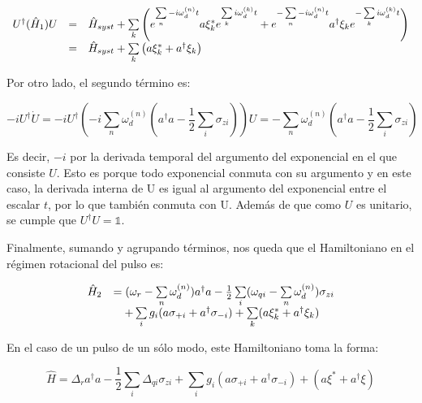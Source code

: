 \begin{equation}
    \begin{array}{r c l}
        U^\dagger (\hat{H}_1) U &=& \hat{H}_{syst} + \sum\limits_k \left(e^{\sum\limits_n-i \omega_d^{(n)} t} a\xi_k^*e^{\sum\limits_k i\omega_d^{(k)}t}+ e^{-\sum\limits_n-i \omega_d^{(n)} t} a^\dagger\xi_ke^{-\sum\limits_k i\omega_d^{(k)}t}\right) \\
                                &=& \hat{H}_{syst} + \sum\limits_k \left(a\xi_k^* + a^\dagger\xi_k\right)
    \end{array}
\end{equation}

Por otro lado, el segundo término es:

\begin{equation}
    - i U^\dagger \dot{U} = -i U^\dagger (-i \sum\limits_n \omega_d^{(n)} (a^\dagger a - \frac{1}{2} \sum\limits_i \sigma_{z i})) U = - \sum\limits_n \omega_d^{(n)}(a^\dagger a - \frac{1}{2} \sum\limits_i \sigma_{z i})
\end{equation}

Es decir, $-i$ por la derivada temporal del argumento del exponencial en el que consiste $U$. Esto es porque todo exponencial conmuta con su argumento y en este caso, la derivada interna de U es igual al argumento del exponencial entre el escalar $t$, por lo que también conmuta con U. Además de que como $U$ es unitario, se cumple que $U^\dagger U = \mathds{1}$.

Finalmente, sumando y agrupando términos, nos queda que el Hamiltoniano en el régimen rotacional del pulso es:

\begin{equation}
    \begin{array}{r l}
        \hat{H}_2 &= (\omega_r - \sum\limits_n \omega_d^{(n)}) a^\dag a - \frac{1}{2} \sum\limits_i (\omega_{qi} - \sum\limits_n \omega_d^{(n)}) \sigma_{zi} \\
                  &\quad + \sum\limits_i g_i (a \sigma_{+ i} + a^\dagger \sigma_{- i}) + \sum\limits_k (a\xi_k^* + a^\dagger\xi_k)
    \end{array}
\end{equation}

En el caso de un pulso de un sólo modo, este Hamiltoniano toma la forma:

\begin{equation}
    \hat{H} = \Delta_r a^\dagger a - \frac{1}{2} \sum\limits_i \Delta_{qi} \sigma_{zi} + \sum\limits_i g_i (a \sigma_{+ i} + a^\dagger \sigma_{- i}) + (a\xi^*+a^\dagger\xi )
\end{equation}

